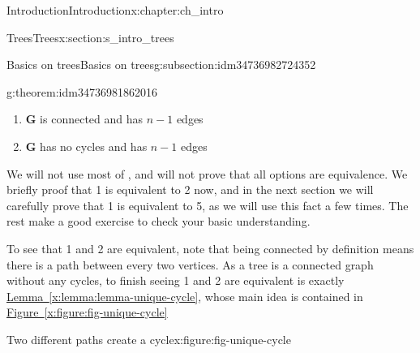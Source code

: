 \documentclass[oneside,10pt,]{book}
\newcommand{\xreffont}{\relax}
\numberwithin{equation}{section}
\newcommand{\bfG}{\mathbf{G}}
\begin{document}
\begin{chapterptx}{Introduction}{}{Introduction}{}{}{x:chapter:ch_intro}
\begin{sectionptx}{Trees}{}{Trees}{}{}{x:section:s_intro_trees}
\begin{subsectionptx}{Basics on trees}{}{Basics on trees}{}{}{g:subsection:idm34736982724352}
\begin{theorem}{}{}{g:theorem:idm34736981862016}
\begin{enumerate}
\item{}\(\bfG\) is connected and has \(n-1\) edges%
\item{}\(\bfG\) has no cycles and has \(n-1\) edges%
\end{enumerate}
\end{theorem}
We will not use most of , and will not prove that all options are equivalence.  We briefly proof that 1 is equivalent to 2 now, and in the next section we will carefully prove that 1 is equivalent to 5, as we will use this fact a few times.  The rest make a good exercise to check your basic understanding.%
\par
To see that 1 and 2 are equivalent, note that being connected by definition means there is a path between every two vertices.  As a tree is a connected graph without any cycles, to finish seeing 1 and 2 are equivalent is exactly \hyperref[x:lemma:lemma-unique-cycle]{Lemma~{\xreffont\ref{x:lemma:lemma-unique-cycle}}}, whose main idea is contained in \hyperref[x:figure:fig-unique-cycle]{Figure~{\xreffont\ref{x:figure:fig-unique-cycle}}}%
\begin{figureptx}{Two different paths create a cycle}{x:figure:fig-unique-cycle}{}%
\begin{image}{0.05}{0.9}{0.05}%
\end{image}
\end{figureptx}
\end{subsectionptx}
\end{sectionptx}
\end{chapterptx}
\end{document}
